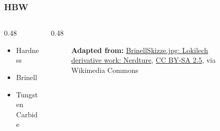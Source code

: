 \begin{frame}
	\frametitle{HBW}

    \begin{columns}
        \begin{column}{0.48\linewidth}
            \begin{itemize}[<+- | alert@+>]
                \item[H] Hardness
                \item[B] Brinell
                \item[W] Tungsten Carbide
            \end{itemize}
        \end{column}
        \begin{column}{0.48\linewidth}
            \begin{figure}
                \centering
                \resizebox{0.375\linewidth}{!}{
                    
                }

                \vspace{0.5em}
                {\tiny \textbf{Adapted from:} \href{https://commons.wikimedia.org/wiki/File:BrinellHardness.svg}{BrinellSkizze.jpg: Lokilech derivative work: Nerdture}, \href{https://creativecommons.org/licenses/by-sa/2.5}{CC BY-SA 2.5}, via Wikimedia Commons\par}
            \end{figure}
        \end{column}
    \end{columns}
\end{frame}

